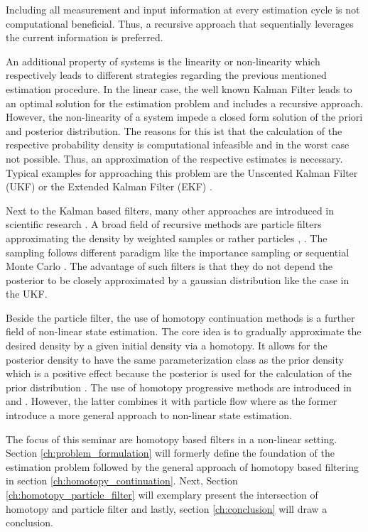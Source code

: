 \documentclass[a4paper]{IEEEtran}
\begin{document}
Including all measurement and input information at every estimation cycle is not computational beneficial. Thus, a recursive approach that sequentially leverages the current information is preferred.

An additional property of systems is the linearity or non-linearity which respectively leads to different strategies regarding the previous mentioned estimation procedure.
In the linear case, the well known Kalman Filter \cite{Kalman1960} leads to an optimal solution for the estimation problem and includes a recursive approach. However, the non-linearity of a system
impede a closed form solution of the priori and posterior distribution. The reasons for this ist that the calculation of the respective probability density is computational infeasible and in the worst case not
possible. Thus, an approximation of the respective estimates is necessary. Typical examples for approaching this problem are the Unscented Kalman Filter (UKF) \cite{julier2004} or the Extended Kalman Filter (EKF) \cite{jazwinski2007}.

Next to the Kalman based filters, many other approaches are introduced in scientific research \cite{daum2005}. A broad field of recursive methods are particle filters approximating the density by weighted samples or rather particles \cite{arulampalam2002}, \cite{crisan2002}. 
The sampling follows different paradigm like the importance sampling or sequential Monte Carlo \cite{cappe2007b}. The advantage of such filters is that they do not depend the posterior to be closely approximated by a gaussian distribution \cite{cappe2007b} like the 
case in the UKF.

Beside the particle filter, the use of homotopy continuation methods is a further field of non-linear state estimation. The core idea is to gradually approximate the desired density by a given initial density via a homotopy. 
It allows for the posterior density to have the same parameterization class as the prior density which is a positive effect because the posterior is used for the calculation of the prior distribution \cite{hagmar2011}. 
The use of homotopy progressive methods are introduced in \cite{hanebeck2003} and \cite{daum2005}. However, the latter combines it with particle flow where as the former introduce a more general approach to non-linear state estimation.

The focus of this seminar are homotopy based filters in a non-linear setting. Section \ref{ch:problem_formulation} will formerly define the foundation of the estimation problem followed by the general approach of
homotopy based filtering in section \ref{ch:homotopy_continuation}. Next, Section \ref{ch:homotopy_particle_filter} will exemplary present the intersection of homotopy and particle filter and lastly, section \ref{ch:conclusion} will draw a conclusion.
\end{document}
